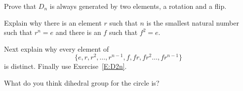 \documentclass{ximera}
\begin{document}
\begin{exercise}
  Prove that $D_n$ is always generated by two elements, a rotation and
  a flip.
  \begin{hint}
    Explain why there is an element $r$ such that $n$ is the smallest
    natural number such that $r^n =e$ and there is an $f$ such that
    $f^2 = e$.

    Next explain why every element of
    \[
    \{e, r, r^2,\dots,r^{n-1}, f, fr, fr^2 \dots, fr^{n-1}\}
    \]
    is distinct. Finally use Exercise~\ref{E:D2n}.
  \end{hint}
\end{exercise}


\begin{exercise}
  What do you think dihedral group for the circle is?
\end{exercise}
\end{document}
